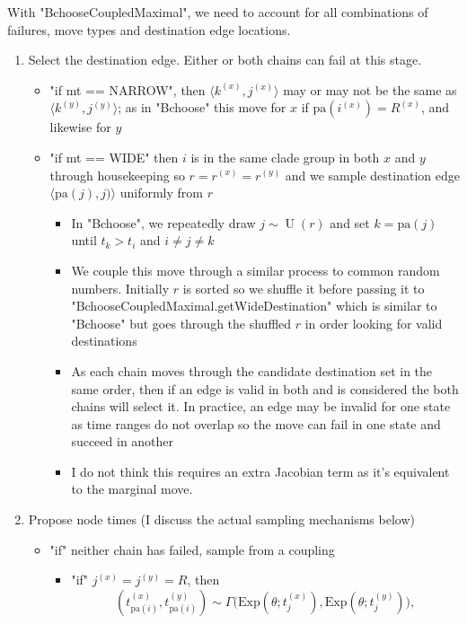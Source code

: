 \documentclass[11pt,a4paper]{article}
\newcommand{\edge}[2]{\langle#1, #2\rangle}
\newcommand{\pa}{\mathrm{pa}}
\newcommand{\Exp}[1]{\mathrm{Exp}(#1)}
\DeclareMathOperator*{\Unif}{\mathrm{U}}
\begin{document}
With "BchooseCoupledMaximal", we need to account for all combinations of failures, move types and destination edge locations.
\begin{enumerate}
    \item Select the destination edge. Either or both chains can fail at this stage.
    \begin{itemize}
        \item "if mt == NARROW", then $ \edge{k^{(x)}}{j^{(x)}} $ may or may not be the same as $ \edge{k^{(y)}}{j^{(y)}} $; as in "Bchoose" this move for $ x $ if $ \pa(i^{(x)}) = R^{(x)} $, and likewise for $ y $
        \item "if mt == WIDE" then $ i $ is in the same clade group in both $ x $ and $ y $ through housekeeping so $ r = r^{(x)} = r^{(y)} $ and we sample destination edge $ \edge{\pa(j)}{j)} $ uniformly from $ r $
        \begin{itemize}
            \item In "Bchoose", we repeatedly draw $ j \sim \Unif(r) $ and set $ k = \pa(j) $ until $ t_k > t_i $ and $ i \neq j \neq k $
            \item We couple this move through a similar process to common random numbers. Initially $ r $ is sorted so we shuffle it before passing it to "BchooseCoupledMaximal.getWideDestination" which is similar to "Bchoose" but goes through the shuffled $ r $ in order looking for valid destinations
            \item As each chain moves through the candidate destination set in the same order, then if an edge is valid in both and is considered the both chains will select it. In practice, an edge may be invalid for one state as time ranges do not overlap so the move can fail in one state and succeed in another
            \item I do not think this requires an extra Jacobian term as it's equivalent to the marginal move.
        \end{itemize}
    \end{itemize}
    \item Propose node times (I discuss the actual sampling mechanisms below)
    \begin{itemize}
        \item "if" neither chain has failed, sample from a coupling
        \begin{itemize}
            \item "if" $ j^{(x)} = j^{(y)} = R $, then
            \[
                (t_{\pa(i)}^{(x)}, t_{\pa(i)}^{(y)}) \sim \Gamma\big(\Exp{\theta; t_j^{(x)}}, \Exp{\theta; t_j^{(y)}}\big),
\]
\end{itemize}
\end{itemize}
\end{enumerate}
\end{document}
